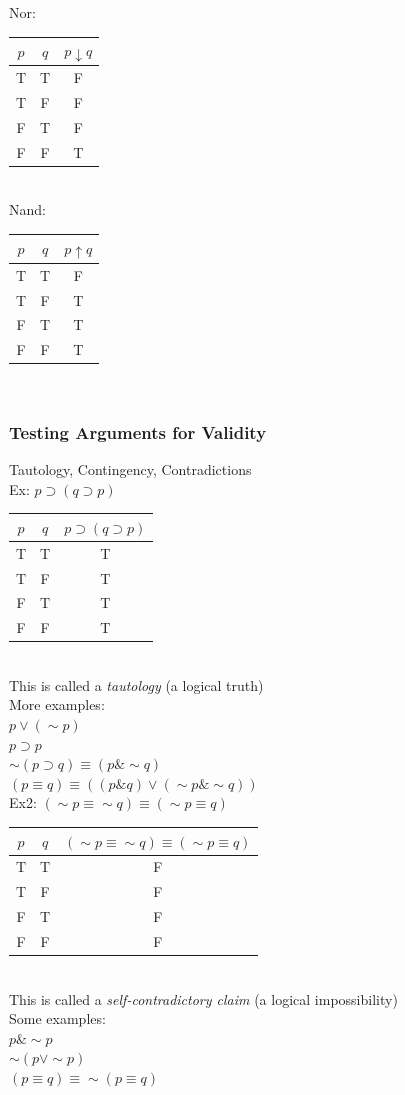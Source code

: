 \documentclass[11pt, fleqn]{article}
\begin{document}
Nor:\\
\begin{tabular}{c|c|c}
    $p$ & $q$ & $p\downarrow q$\\
    \hline
    T & T & F\\
    T & F & F\\
    F & T & F\\
    F & F & T
\end{tabular}\\

Nand:\\
\begin{tabular}{c|c|c}
    $p$ & $q$ & $p\uparrow q$\\
    \hline
    T & T & F\\
    T & F & T\\
    F & T & T\\
    F & F & T
\end{tabular}\\

\subsubsection{Testing Arguments for Validity}
Tautology, Contingency, Contradictions\\
Ex: $p\supset(q\supset p)$\\
\begin{tabular}{c|c|c}
    $p$ & $q$ & $p\supset(q\supset p)$\\
    \hline
    T & T & T\\
    T & F & T\\
    F & T & T\\
    F & F & T
\end{tabular}\\
This is called a \textit{tautology} (a logical truth)\\
More examples:\\
$p\vee(\sim p)$\\
$p\supset p$\\
$\sim(p\supset q)\equiv(p\&\sim q)$\\
$(p\equiv q)\equiv((p\&q)\vee(\sim p\&\sim q))$\\

Ex2: $(\sim p\equiv\sim q)\equiv(\sim p\equiv q)$\\
\begin{tabular}{c|c|c}
    $p$ & $q$ & $(\sim p\equiv\sim q)\equiv(\sim p\equiv q)$\\
    \hline
    T & T & F\\
    T & F & F\\
    F & T & F\\
    F & F & F
\end{tabular}\\
This is called a \textit{self-contradictory claim} (a logical impossibility)\\
Some examples:\\
$p\&\sim p$\\
$\sim(p\vee \sim p)$\\
$(p\equiv q)\equiv\sim(p\equiv q)$\\
\end{document}

